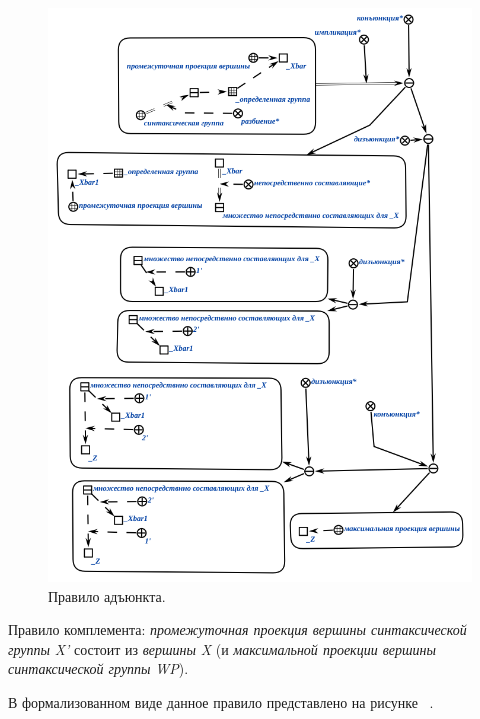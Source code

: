 \begin{figure}[h]
    \centering
    \includegraphics[scale=0.8]{images/part2/chapter_lang/adjunct_rule}
    \caption{Правило адъюнкта.}
    \label{fig:adjunct_rule}
\end{figure}

Правило комплемента: \textit{промежуточная проекция вершины синтаксической группы}  \textit{X'} состоит из \textit{вершины} \textit{X} (и \textit{максимальной проекции вершины синтаксической группы} \textit{WP}).

В формализованном виде данное правило представлено на рисунке ~\textit{}.

